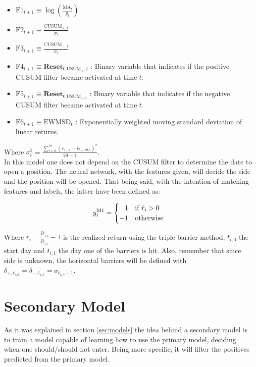 \documentclass[a4paper]{article}
\begin{document}
\begin{itemize}
	\item $\text{F1}_{t+1} \equiv \log \left( \frac{\text{MA}_t}{p_t} 
	\right)$
	
	\item $\text{F2}_{t+1} \equiv \frac{\text{CUSUM}_{+,\ t}}{
	\sigma_t}$
	
	\item $\text{F3}_{t+1} \equiv \frac{\text{CUSUM}_{-,\ t}}
	{\sigma_t}$
	
	\item $\text{F4}_{t+1} \equiv \textbf{Reset}_{\text{CUSUM}_{+},t}$ 
	: Binary variable that indicates if the positive CUSUM filter 	
	became activated at time $t$.
	
	\item $\text{F5}_{t+1} \equiv \textbf{Reset}_{\text{CUSUM}_{-,t}}$
	: Binary variable that indicates if the negative CUSUM filter 	
	became activated at time $t$.
	
	\item $\text{F6}_{t+1} \equiv \text{EWMSD}_t$ 
	: Exponentially weighted moving standard deviation of linear 
	returns.
\end{itemize}

Where $\sigma_t^2 = \frac{\sum_{i=0}^{19}(r_{t-i} - 
\bar{r}_{t-19, t})^2}{20 - 1}$.\\

In this model one does not depend on the CUSUM filter to determine the 
date to open a position. The neural network, with the  features given, 
will decide the side and the position will be opened. That being said, 
with the intention of matching features and labels, the latter have 
been defined as:

\begin{equation}
	y_{i}^{\text{M1}} = 
	\begin{cases}
	\hfill 1 & \text{if}\ \tilde{r}_i > 0\\
	\hfill -1 & \text{otherwise}	
	\end{cases}
\end{equation}

Where $\tilde{r}_i = \frac{p_{t_{i,1}}}{p_{t_{i,0}}} -1 $ is the 
realized return using the triple barrier method, $t_{i,0}$ the start 
day and $t_{i,1}$ the day one of the barriers is hit. Also, remember 
that since side is unknown, the horizontal barriers will be defined 
with $\delta_{+, t_{i,0}} = \delta_{-, t_{i,0}} = \sigma_{t_{i,0}-1}$.

\section{Secondary Model}
\label{sec:secondaryModel}
As it was explained in section \ref{sec:models} the idea behind a 
secondary model is to train a model capable of learning how to use the 
primary model, deciding when one should/should not enter. Being more 
specific, it will filter the positives predicted from the primary 
model.\\
\end{document}
